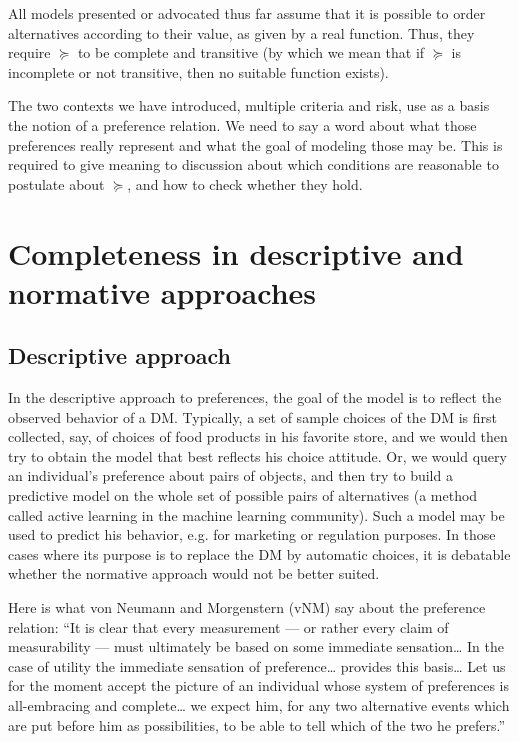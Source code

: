 \documentclass[french, english]{llncs}
\begin{document}
	All models presented or advocated thus far assume that it is possible to order alternatives according to their value, as given by a real function. Thus, they require $\succeq$ to be complete and transitive (by which we mean that if $\succeq$ is incomplete or not transitive, then no suitable function exists).
	
	The two contexts we have introduced, multiple criteria and risk, use as a basis the notion of a preference relation. We need to say a word about what those preferences really represent and what the goal of modeling those may be. This is required to give meaning to discussion about which conditions are reasonable to postulate about $\succeq$, and how to check whether they hold.
	
	\section{Completeness in descriptive and normative approaches}\label{sec:nordesc}
	\subsection{Descriptive approach}
	In the descriptive approach to preferences, the goal of the model is to reflect the observed behavior of a \ac{DM}. Typically, a set of sample choices of the \ac{DM} is first collected, say, of choices of food products in his favorite store, and we would then try to obtain the model that best reflects his choice attitude. Or, we would query an individual’s preference about pairs of objects, and then try to build a predictive model on the whole set of possible pairs of alternatives (a method called active learning in the machine learning community). Such a model may be used to predict his behavior, e.g. for marketing or regulation purposes. In those cases where its purpose is to replace the \ac{DM} by automatic choices, it is debatable whether the normative approach would not be better suited.
	
	Here is what von Neumann and Morgenstern (vNM) say about the preference relation:
	“It is clear that every measurement --- or rather every claim of measurability --- must ultimately be based on some immediate sensation\ldots
	In the case of utility the immediate sensation of preference\ldots%
	provides this basis\ldots %
	Let us for the moment accept the picture of an individual whose system of preferences is all-embracing and complete\ldots%
	 we expect him, for any two alternative events which are put before him as possibilities, to be able to tell which of the two he prefers.” %
	
\end{document}
